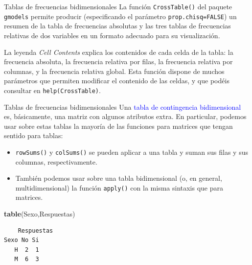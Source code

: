 \documentclass[
  ignorenonframetext,
  aspectratio=169]{beamer}
\newenvironment{Shaded}{\begin{snugshade}}{\end{snugshade}}
\newcommand{\FunctionTok}[1]{\textcolor[rgb]{0.13,0.29,0.53}{\textbf{#1}}}
\newcommand{\NormalTok}[1]{#1}
\newcommand\blue[1]{\textcolor{blue}{#1}}
\begin{document}
\begin{frame}[fragile]{Tablas de frecuencias bidimensionales}
\label{tablas-de-frecuencias-bidimensionales-7}
La función \texttt{CrossTable()} del paquete \texttt{gmodels} permite
producir (especificando el parámetro \texttt{prop.chisq=FALSE}) un
resumen de la tabla de frecuencias absolutas y las tres tablas de
frecuencias relativas de dos variables en un formato adecuado para su
visualización.

La leyenda \emph{Cell Contents} explica los contenidos de cada celda de
la tabla: la frecuencia absoluta, la frecuencia relativa por filas, la
frecuencia relativa por columnas, y la frecuencia relativa global. Esta
función dispone de muchos parámetros que permiten modificar el contenido
de las celdas, y que podéis consultar en \texttt{help(CrossTable)}.
\end{frame}

\begin{frame}[fragile]{Tablas de frecuencias bidimensionales}
\label{tablas-de-frecuencias-bidimensionales-8}
Una \blue{tabla de contingencia bidimensional} es, básicamente, una
matriz con algunos atributos extra. En particular, podemos usar sobre
estas tablas la mayoría de las funciones para matrices que tengan
sentido para tablas:

\begin{itemize}
\item
  \texttt{rowSums()} y \texttt{colSums()} se pueden aplicar a una tabla
  y suman sus filas y sus columnas, respectivamente.
\item
  También podemos usar sobre una tabla bidimensional (o, en general,
  multidimensional) la función \texttt{apply()} con la misma sintaxis
  que para matrices.
\end{itemize}

\begin{Shaded}
\begin{Highlighting}[]
\FunctionTok{table}\NormalTok{(Sexo,Respuestas) }
\end{Highlighting}
\end{Shaded}

\begin{verbatim}
    Respuestas
Sexo No Si
   H  2  1
   M  6  3
\end{verbatim}
\end{frame}
\end{document}

